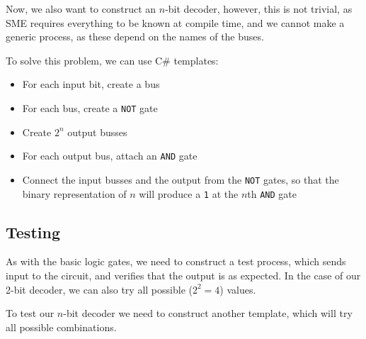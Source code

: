 \documentclass{beamer}
\renewcommand{\tt}{\texttt}
\begin{document}
\begin{frame}[fragile]
    
\end{frame}
\begin{frame}
    
\end{frame}
\begin{frame}
    Now, we also want to construct an $n$-bit decoder, however, this is not
    trivial, as SME requires everything to be known at compile time, and we
    cannot make a generic process, as these depend on the names of the buses.

    \vspace{\baselineskip}
    To solve this problem, we can use C\# templates:
    \begin{itemize}
        \item For each input bit, create a bus
        \item For each bus, create a \tt{NOT} gate
        \item Create $2^n$ output busses
        \item For each output bus, attach an \tt{AND} gate
        \item Connect the input busses and the output from the \tt{NOT} gates,
            so that the binary representation of $n$ will produce a \tt{1} at
            the $n$th \tt{AND} gate
    \end{itemize}
\end{frame}
\begin{frame}[fragile]
    
\end{frame}
\begin{frame}[fragile]
    
\end{frame}

\subsection{Testing}
\begin{frame}
    As with the basic logic gates, we need to construct a test process, which
    sends input to the circuit, and verifies that the output is as expected. In
    the case of our 2-bit decoder, we can also try all possible ($2^2=4$)
    values.

    \vspace{\baselineskip}
    To test our $n$-bit decoder we need to construct another template, which
    will try all possible combinations.
\end{frame}
\end{document}
